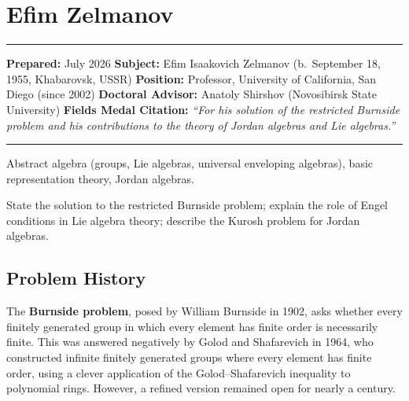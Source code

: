 \chapter{Efim Zelmanov}\label{ch1994efimzelmanov:efim-zelmanov-fields-medal-1994-a-comprehensive-report-on-his-work-and-impact}

\begin{center}\rule{0.5\linewidth}{0.5pt}\end{center}

\textbf{Prepared:} July 2026
\textbf{Subject:} Efim Isaakovich Zelmanov (b.\ September 18, 1955, Khabarovsk, USSR)
\textbf{Position:} Professor, University of California, San Diego (since 2002)
\textbf{Doctoral Advisor:} Anatoly Shirshov (Novosibirsk State University)
\textbf{Fields Medal Citation:} \emph{``For his solution of the restricted Burnside problem \cite{zelmanov1992}
and his contributions to the theory of Jordan algebras and Lie algebras.''}

\begin{center}\rule{0.5\linewidth}{0.5pt}\end{center}

\begin{prereqs}
Abstract algebra (groups, Lie algebras, universal enveloping algebras),
basic representation theory, Jordan algebras.
\end{prereqs}

\begin{objectives}
State the solution to the restricted Burnside problem;
explain the role of Engel conditions in Lie algebra theory;
describe the Kurosh problem for Jordan algebras.
\end{objectives}

\section{Problem History}

The \textbf{Burnside problem}, posed by William Burnside in 1902,
asks whether every finitely generated group in which every element
has finite order is necessarily finite.  This was answered
negatively by Golod and Shafarevich in 1964, who constructed
infinite finitely generated groups where every element has finite
order, using a clever application of the Golod--Shafarevich
inequality to polynomial rings.  However, a refined version
remained open for nearly a century.

